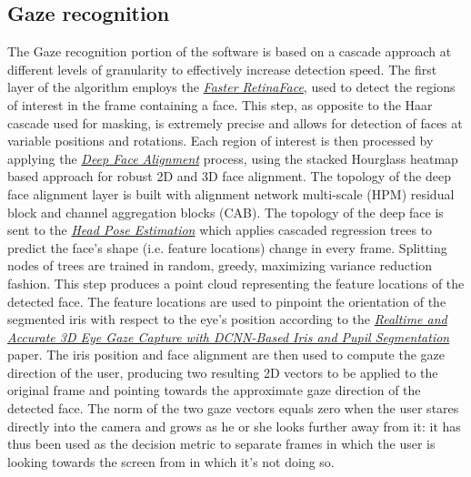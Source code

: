\documentclass[a4paper, 12pt]{article}
\begin{document}
\subsection{Gaze recognition}
\label{GazeRec}
The Gaze recognition portion of the software is based on a cascade approach at different levels of granularity to effectively increase detection speed.
The first layer of the algorithm employs the \textit{\hyperref[Ref12]{Faster RetinaFace}}, used to detect the regions of interest in the frame containing a face. This step, as opposite to the Haar cascade used for masking, is extremely precise and allows for detection of faces at variable positions and rotations.\linebreak
Each region of interest is then processed by applying the \textit{\hyperref[Ref13]{Deep Face Alignment}} process, using the  stacked Hourglass heatmap based approach for robust 2D and 3D face alignment. The topology of the deep face alignment layer is built with alignment network multi-scale (HPM) residual block and channel aggregation blocks (CAB).
The topology of the deep face is sent to the \textit{\hyperref[Ref14]{Head Pose Estimation}} which applies cascaded regression trees to predict the face's shape (i.e. feature locations) change in every frame. Splitting nodes of trees are trained in random, greedy, maximizing variance reduction fashion. This step produces a point cloud representing the feature locations of the detected face.\linebreak
The feature locations are used to pinpoint the orientation of the segmented iris with respect to the eye's position according to the \textit{\hyperref[Ref7]{Realtime and Accurate 3D Eye Gaze Capture with DCNN-Based Iris and Pupil Segmentation}} paper.
The iris position and face alignment are then used to compute the gaze direction of the user, producing two resulting 2D vectors to be applied to the original frame and pointing towards the approximate gaze direction of the detected face.\linebreak
The norm of the two gaze vectors equals zero when the user stares directly into the camera and grows as he or she looks further away from it: it has thus been used as the decision metric to separate frames in which the user is looking towards the screen from in which it's not doing so.
\end{document}
